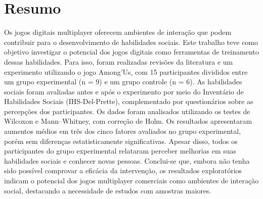 \chapter*{Resumo}

Os jogos digitais multiplayer oferecem ambientes de interação que podem contribuir para o desenvolvimento de habilidades sociais. Este trabalho teve como objetivo investigar o potencial dos jogos digitais como ferramentas de treinamento dessas habilidades. Para isso, foram realizadas revisões da literatura e um experimento utilizando o jogo Among’Us, com 15 participantes divididos entre um grupo experimental (n = 9) e um grupo controle (n = 6). As habilidades sociais foram avaliadas antes e após o experimento por meio do Inventário de Habilidades Sociais (IHS-Del-Prette), complementado por questionários sobre as percepções dos participantes. Os dados foram analisados utilizando os testes de Wilcoxon e Mann–Whitney, com correção de Holm. Os resultados apresentaram aumentos médios em três dos cinco fatores avaliados no grupo experimental, porém sem diferenças estatisticamente significativas. Apesar disso, todos os participantes do grupo experimental relataram perceber melhorias em suas habilidades sociais e conhecer novas pessoas. Conclui-se que, embora não tenha sido possível comprovar a eficácia da intervenção, os resultados exploratórios indicam o potencial dos jogos multiplayer comerciais como ambientes de interação social, destacando a necessidade de estudos com amostras maiores.
